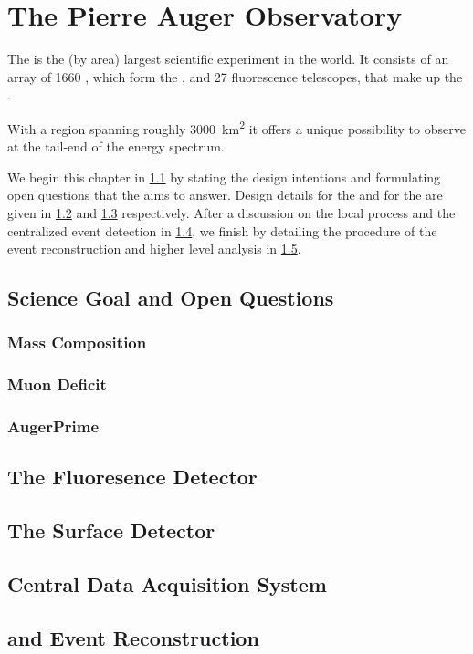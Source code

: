
\chapter{The Pierre Auger Observatory}
\label{chap:pierre-auger-observatory}

The \PAO is the (by area) largest scientific experiment in the world. It 
consists of an array of 1660 \WCDs, which form the \SD, and 27 fluorescence 
telescopes, that make up the \FD.

With a region spanning roughly \SI{3000}{\kilo\meter\squared} it offers a unique
possibility to observe \UHECRs at the tail-end of the \CR energy spectrum. 

We begin this chapter in \cref{sec:science-case} by stating the design 
intentions and formulating open questions that the \PAO aims to answer. Design
details for the \FD and for the \SD are given in \cref{sec:fd} and \cref{sec:sd} 
respectively. After a discussion on the local \DAQ process and the centralized 
event detection in \cref{sec:cdas}, we finish by detailing the procedure of the
event reconstruction and higher level analysis in \cref{sec:rec}.

\section{Science Goal and Open Questions}
\label{sec:science-case}

\subsection{Mass Composition}
\subsection{Muon Deficit}
\subsection{AugerPrime}


\section{The Fluoresence Detector}
\label{sec:fd}



\section{The Surface Detector}
\label{sec:sd}



\section{Central Data Acquisition System}
\label{sec:cdas}



\section{\Offline and Event Reconstruction}
\label{sec:rec}

